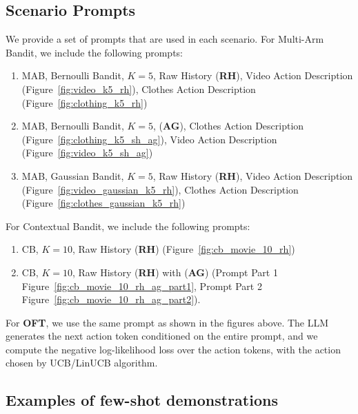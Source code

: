 \subsection{Scenario Prompts}
\label{app_subsec: prompt}
We provide a set of prompts that are used in each scenario. For Multi-Arm Bandit, we include the following prompts:
\begin{enumerate}
    \item MAB, Bernoulli Bandit, $K=5$, Raw History (\textbf{RH}), Video Action Description (Figure~\ref{fig:video_k5_rh}), Clothes Action Description (Figure~\ref{fig:clothing_k5_rh})
    \item MAB, Bernoulli Bandit, $K=5$, \ag (\textbf{AG}), Clothes Action Description (Figure~\ref{fig:clothing_k5_sh_ag}), Video Action Description (Figure~\ref{fig:video_k5_sh_ag})
    \item MAB, Gaussian Bandit, $K=5$, Raw History (\textbf{RH}), Video Action Description (Figure~\ref{fig:video_gaussian_k5_rh}), Clothes Action Description (Figure~\ref{fig:clothes_gaussian_k5_rh})
\end{enumerate}

For Contextual Bandit, we include the following prompts:
\begin{enumerate}
    \item CB, $K=10$, Raw History (\textbf{RH}) (Figure~\ref{fig:cb_movie_10_rh})
    \item CB, $K=10$, Raw History (\textbf{RH}) with \ag (\textbf{AG}) (Prompt Part 1 Figure~\ref{fig:cb_movie_10_rh_ag_part1}, Prompt Part 2 Figure~\ref{fig:cb_movie_10_rh_ag_part2}).
\end{enumerate}

For \textbf{OFT}, we use the same prompt as shown in the figures above. The LLM generates the next action token conditioned on the entire prompt, and we compute the negative log-likelihood loss over the action tokens, with the action chosen by UCB/LinUCB algorithm.

\subsection{Examples of few-shot demonstrations}
\label{app_subsec: few_shot}

